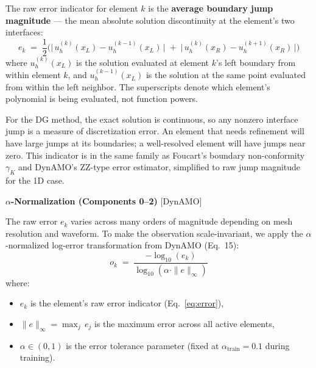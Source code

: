 \documentclass[11pt]{article}
\newcommand{\provdynamo}{\textcolor{dynamo}{\textsf{[DynAMO]}}}
\begin{document}
\vspace{0.15cm}
\noindent The raw error indicator for element $k$ is the \textbf{average boundary jump magnitude} --- the mean absolute solution discontinuity at the element's two interfaces:
\begin{equation}
e_k \;=\; \frac{1}{2}\Big(\big|\,u_h^{(k)}(x_L) - u_h^{(k-1)}(x_L)\,\big| \;+\; \big|\,u_h^{(k)}(x_R) - u_h^{(k+1)}(x_R)\,\big|\Big)
\label{eq:error}
\end{equation}
where $u_h^{(k)}(x_L)$ is the solution evaluated at element $k$'s left boundary from within element $k$, and $u_h^{(k-1)}(x_L)$ is the solution at the same point evaluated from within the left neighbor. The superscripts denote which element's polynomial is being evaluated, not function powers.

For the DG method, the exact solution is continuous, so any nonzero interface jump is a measure of discretization error. An element that needs refinement will have large jumps at its boundaries; a well-resolved element will have jumps near zero. This indicator is in the same family as Foucart's boundary non-conformity $\gamma_K$ and DynAMO's ZZ-type error estimator, simplified to raw jump magnitude for the 1D case.

\vspace{0.5cm}
\noindent\textbf{$\alpha$-Normalization (Components 0--2)} \provdynamo

\vspace{0.15cm}
\noindent The raw error $e_k$ varies across many orders of magnitude depending on mesh resolution and waveform. To make the observation scale-invariant, we apply the $\alpha$-normalized log-error transformation from DynAMO (Eq.~15):
\begin{equation}
\boxed{\;o_k \;=\; \frac{-\log_{10}(e_k)}{\log_{10}(\alpha \cdot \|e\|_\infty)}\;}
\label{eq:alpha_norm}
\end{equation}
where:
\begin{itemize}[leftmargin=1.5em, itemsep=3pt]
    \item $e_k$ is the element's raw error indicator (Eq.~\ref{eq:error}),
    \item $\|e\|_\infty = \max_j \, e_j$ is the maximum error across all active elements,
    \item $\alpha \in (0, 1)$ is the error tolerance parameter (fixed at $\alpha_{\text{train}} = 0.1$ during training).
\end{itemize}
\end{document}
